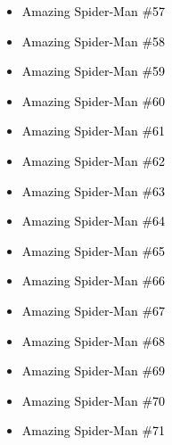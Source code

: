 \documentclass[12pt]{article}
\newcommand{\checkbox}{\raisebox{0.0ex}{\fbox{\rule{0ex}{1.5ex} \rule{1.5ex}{0ex}}}}
\begin{document}
\begin{center}
\begin{tcolorbox}[colback=white!95!gray, colframe=black, width=0.9\textwidth, arc=4mm, auto outer arc, boxrule=0.8pt]
\begin{itemize}[left=0pt,label={\checkbox}]
    \item \textcolor{black}{Amazing Spider-Man \#57}
    \item \textcolor{black}{Amazing Spider-Man \#58}
    \item \textcolor{black}{Amazing Spider-Man \#59}
    \item \textcolor{black}{Amazing Spider-Man \#60}
    \item \textcolor{black}{Amazing Spider-Man \#61}
    \item \textcolor{black}{Amazing Spider-Man \#62}
    \item \textcolor{black}{Amazing Spider-Man \#63}
    \item \textcolor{black}{Amazing Spider-Man \#64}
    \item \textcolor{black}{Amazing Spider-Man \#65}
    \item \textcolor{black}{Amazing Spider-Man \#66}
    \item \textcolor{black}{Amazing Spider-Man \#67}
    \item \textcolor{black}{Amazing Spider-Man \#68}
    \item \textcolor{black}{Amazing Spider-Man \#69}
    \item \textcolor{black}{Amazing Spider-Man \#70}
    \item \textcolor{black}{Amazing Spider-Man \#71}
\end{itemize}
\end{tcolorbox}
\end{center}
\end{document}
